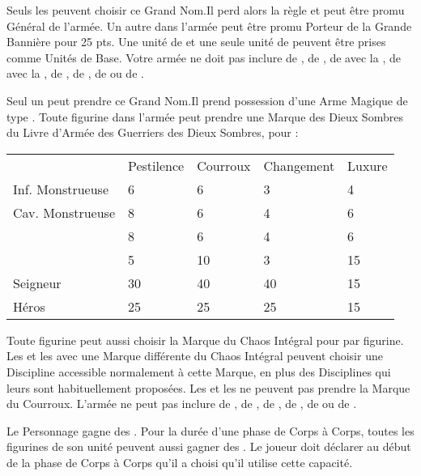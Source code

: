 \begin{multicols}{2}
\startpricelistNSP

Seuls les \mammothhunters{} peuvent choisir ce Grand Nom.\newline Il perd alors la règle \notaleader{} et peut être promu Général de l'armée. Un autre \mammothhunter{} dans l'armée peut être promu Porteur de la Grande Bannière pour 25 pts. Une unité de \yetis{} et une seule unité de \sabretoothtigers{} peuvent être prises comme Unités de Base. Votre armée ne doit pas inclure de \greatkhans{}, de \khans{}, de \shamans{} avec la \fireblessing{}, de \greatshamans{} avec la \greaterfireblessing{}, de \bruisers{}, de \mercenaryveterans{}, de \bombardiers{} ou de \thundercannons{}.

Seul un \greatkhan{} peut prendre ce Grand Nom.\newline Il prend possession d'une Arme Magique de type \ironfist{}. Toute figurine dans l'armée peut prendre une Marque des Dieux Sombres du Livre d'Armée des Guerriers des Dieux Sombres, pour  :
{\fontsize{6}{7.2}\selectfont
\begin{center}\begin{tabular}{@{}lllll@{}}
& Pestilence & Courroux & Changement & Luxure \tabularnewline
Inf. Monstrueuse & 6 & 6 & 3 & 4 \tabularnewline
Cav. Monstrueuse & 8 & 6 & 4 & 6 \tabularnewline
\chariot{} & 8 & 6 & 4 & 6 \tabularnewline
\riddenmonster{} & 5 & 10 & 3 & 15 \tabularnewline
Seigneur & 30 & 40 & 40 & 15 \tabularnewline
Héros & 25 & 25 & 25 & 15 \tabularnewline
\end{tabular}\end{center}
}
Toute figurine peut aussi choisir la Marque du Chaos Intégral pour  par figurine.\newline
Les \shamans{} et les \greatshamans{} avec une Marque différente du Chaos Intégral peuvent choisir une Discipline accessible normalement à cette Marque, en plus des Disciplines qui leurs sont habituellement proposées. Les \shamans{} et les \greatshamans{} ne peuvent pas prendre la Marque du Courroux.\newline
L'armée ne peut pas inclure de \mammothhunters{}, de \scraplings{}, de \scraplingtrappers{}, de \yetis{}, de \sabretoothtigers{} ou de \scratapults{}.

Le Personnage gagne des \poisonedattacks{}. Pour la durée d'une phase de Corps à Corps, toutes les figurines de son unité peuvent aussi gagner des \poisonedattacks{}. Le joueur doit déclarer au début de la phase de Corps à Corps qu'il a choisi qu'il utilise cette capacité.


\end{multicols}
